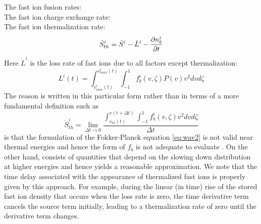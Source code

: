 The fast ion fusion rates:\\
The fast ion charge exchange rate:\\
The fast ion  thermalization rate:\\
\begin{equation}
 \dot S_{th}^i = \dot S^i - \dot L^i -\frac{\partial{ n_b^i}}{\partial{ t}}
 \label{eq:wav5i}
\end{equation}
Here $\dot{L}^i $ is the loss rate of fast ions due to all factors except
thermalization:
\begin{equation}
 L^i(t)  =  \int_{v_{min}^i(t)}^{v_{max}^i(t)}
 \int_{-1}^{1} 
 f_b^i(v,\zeta) P(v)
 v^2dvd\zeta   
 \label{eq:wav5hh}
\end{equation}
The reason  is written in this particular form rather than in
terms of a more fundamental definition such as
\begin{equation}
 \dot S_{th}^i = \lim_{\Delta t \to 0}
 \frac{\int_{v_{th}(t)}^{v(t+\Delta t)}
 \int_{-1}^{1} 
 f_b^i(v,\zeta)v^2dvd\zeta}{\Delta t}
 \label{eq:wav5j}
\end{equation}
is that the formulation of the Fokker-Planck equation \eqref{eq:wav2} is not
valid near thermal energies and hence the form of $f_b $ is not adequate to
evaluate . On the  other hand,  consists of
quantities that depend on the slowing down distribution at higher energies and
hence yields a reasonable approximation. We note that the time delay associated
with the appearance of thermalized fast ions is properly given by this approach.
For example, during the linear (in time) rise of the stored fast ion density
that occurs when the loss rate is zero, the time  derivative term cancels the
source term initially, leading to a thermalization rate of zero until the
derivative term changes.

